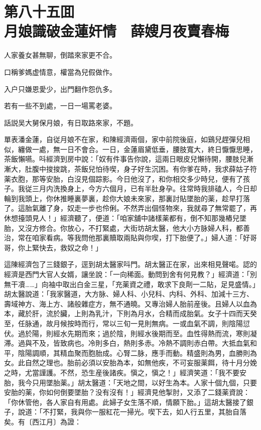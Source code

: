 
\chapter*{第八十五囬　\\月娘識破金蓮奸情　薛嫂月夜賣春梅}


\begin{myquote}
人家養女甚無聊，倒踏來家更不合。

口稱爹媽虚情意，權當為兒假做作。

入户只嫌恩愛少，出門翻作怨仇多。

若有一些不到處，一日一場罵老婆。
\end{myquote}

話説吴大舅保月娘，有日取路來家，不題。

單表潘金蓮，自従月娘不在家，和陳經濟兩個，家中前院後庭，如鷄兒趕彈兒相似，纏做一處，無一日不會合。一日，金蓮眉黛低垂，腰肢寬大，終日懨懨思睡，茶飯懶嚥。呌經濟到房中說：「奴有件事告你說，這兩日眼皮兒懶待開，腰肢兒漸漸大，肚腹中捘捘跳，茶飯兒怕待喫，身子好生沉困。有你爹在時，我求薛姑子符薬衣胞，那等安胎，白沒見個踪影。今日他沒了，和你相交多少時兒，便有了孩子。我従三月内洗換身上，今方六個月，已有半肚身孕。往常時我排磕人，今日却輪到我頭上，你休推睡裏夢裏，趁你大娘未來家，那裏討貼墜胎的薬，趁早打落了。這胎氣離了身，奴走一步也伶俐。不然弄出個怪物來，我就尋了無常罷了，再休想擡頭見人！」經濟聽了，便道：「咱家舖中諸樣薬都有，倒不知那幾樁兒墜胎，又沒方修合。你放心，不打緊處，大街坊胡太醫，他大小方脉婦人科，都善治，常在咱家看病。等我問他那裏贖取兩貼與你喫，打下胎便了。」婦人道：「好哥哥，你上緊快去，救奴之命！」

這陳經濟包了三錢銀子，逕到胡太醫家呌門。胡太醫正在家，出來相見聲喏。認的經濟是西門大官人女婿，讓坐說：「一向稀面。動問到舍有何見教？」經濟道：「別無干凟……」向袖中取出白金三星，「充薬資之禮，敢求下良劑一二貼，足見盛情。」胡太醫說道：「我家醫道，大方脉、婦人科、小兒科、内科、外科、加減十三方、壽域神方、海上方、諸般雜症方，無不通曉。又專治婦人胎前産後。且婦人以血為本，藏於肝，流於臟，上則為乳汁，下則為月水，合精而成胎氣。女子十四而天癸至，任脉通，故月候按時而行，常以三旬一見則無病。一或血氣不調，則陰陽愆伏。過於陽，則經水先期而來；過於陰，則經水後期而至。血性得熱而流，寒則凝滞。過與不及，皆致病也。冷則多白，熱則多赤。冷熱不調則赤白帶。大抵血氣和平，陰陽調順，其精血聚而胞胎成。心腎二脉，應手而動。精盛則為男，血勝則為女。此自然之理也。胎前必須以安胎為本，如無他疾，不可妄服薬餌，待十月分娩之時，尤當謹護。不然，恐生産後諸疾。愼之，愼之！」經濟笑道：「我不要安胎，我今只用墜胎薬。」胡太醫道：「天地之間，以好生為本。人家十個九個，只要安胎的薬，你如何倒要墜胎？没有沒有！」經濟見他掣肘，又添了二錢薬資說：「你休管他，各人家自有用處。此婦子女生落不順，情願下胎。」這胡太醫接了銀子，說道：「不打緊，我與你一服紅花一掃光。喫下去，如人行五里，其胎自落矣。有〔西江月〕為證：

